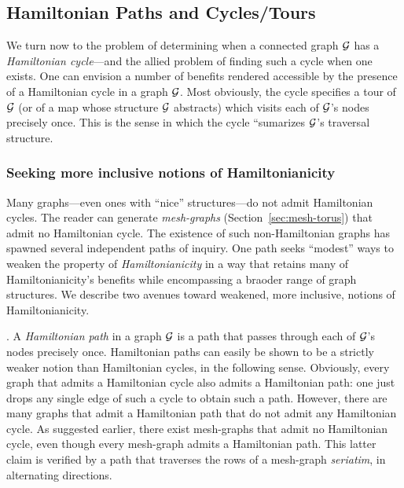 
\subsection{Hamiltonian Paths and Cycles/Tours}
\label{sec:Hamiltonian-cycle}

We turn now to the problem of determining when a connected graph $\mbox{$\cal G$}$
has a {\it Hamiltonian cycle}---and the allied problem of finding such
a cycle when one exists.  One can envision a number of benefits
rendered accessible by the presence of a Hamiltonian cycle in a graph
$\mbox{$\cal G$}$.  Most obviously, the cycle specifies a tour of $\mbox{$\cal G$}$ (or of a map
whose structure $\mbox{$\cal G$}$ abstracts) which visits each of $\mbox{$\cal G$}$'s nodes
precisely once.  This is the sense in which the cycle ``sumarizes
$\mbox{$\cal G$}$'s traversal structure.

\subsubsection{Seeking more inclusive notions of Hamiltonianicity}

Many graphs---even ones with ``nice'' structures---do not admit
Hamiltonian cycles.  The reader can generate {\it mesh-graphs}
(Section~\ref{sec:mesh-torus}) that admit no Hamiltonian cycle.  The
existence of such non-Hamiltonian graphs has spawned several
independent paths of inquiry.  One path seeks ``modest'' ways to
weaken the property of {\it Hamiltonianicity}
 in a way that retains many of
Hamiltonianicity's benefits while encompassing a braoder range of
graph structures.  We describe two avenues toward weakened, more
inclusive, notions of Hamiltonianicity.

.
A {\it Hamiltonian path} 
 in a graph $\mbox{$\cal G$}$ is a path that passes through
each of $\mbox{$\cal G$}$'s nodes precisely once.  Hamiltonian paths can easily be
shown to be a strictly weaker notion than Hamiltonian cycles, in the
following sense.  Obviously, every graph that admits a Hamiltonian
cycle also admits a Hamiltonian path: one just drops any single edge
of such a cycle to obtain such a path.  However, there are many graphs
that admit a Hamiltonian path that do not admit any Hamiltonian cycle.
As suggested earlier, there exist mesh-graphs that admit no
Hamiltonian cycle, even though every mesh-graph admits a Hamiltonian
path.  This latter claim is verified by a path that traverses the rows
of a mesh-graph {\it seriatim}, in alternating directions.

